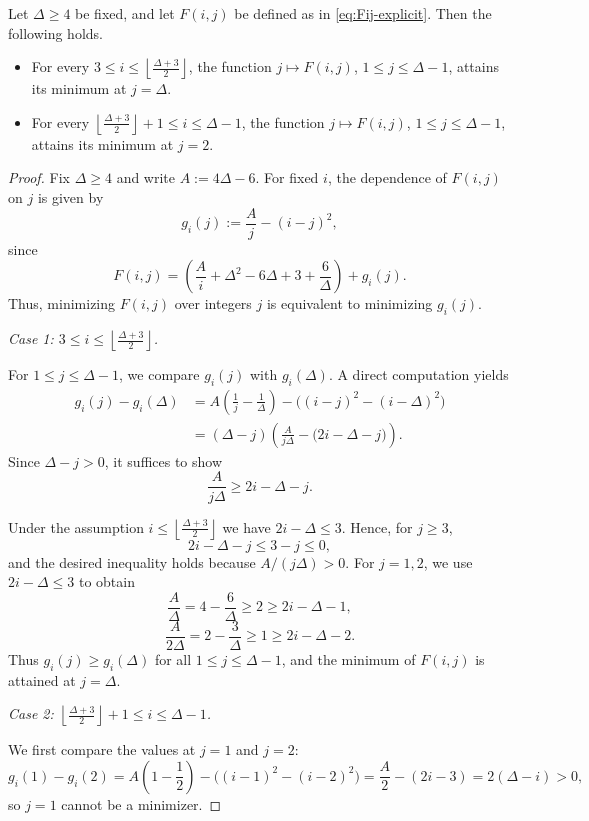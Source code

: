 \documentclass[preprint,12pt]{elsarticle}
\begin{document}
\begin{lemma}
\label{lem:optimal-pair-F}
Let $\Delta \ge 4$ be fixed, and let $F(i,j)$ be defined as in
\eqref{eq:Fij-explicit}.
Then the following holds.
\begin{itemize}
\item For every $3 \le i \le \left\lfloor \frac{\Delta+3}{2} \right\rfloor$, the function
$j \mapsto F(i,j)$, $1 \le j \le \Delta-1$, attains its minimum at $j=\Delta$.
\item For every $\left\lfloor \frac{\Delta+3}{2} \right\rfloor+1 \le i \le \Delta-1$, the function
$j \mapsto F(i,j)$, $1 \le j \le \Delta-1$, attains its minimum at $j=2$.
\end{itemize}
\end{lemma}

\begin{proof}
Fix $\Delta\ge 4$ and write $A:=4\Delta-6$. For fixed $i$, the dependence of $F(i,j)$
on $j$ is given by
\[
g_i(j):=\frac{A}{j}-(i-j)^2,
\]
since
\[
F(i,j)=\left(\frac{A}{i}+\Delta^2-6\Delta+3+\frac{6}{\Delta}\right)+g_i(j).
\]
Thus, minimizing $F(i,j)$ over integers $j$ is equivalent to minimizing $g_i(j)$.

\medskip
\noindent\emph{Case 1: $3\le i \le \left\lfloor\frac{\Delta+3}{2}\right\rfloor$.}

For $1\le j\le \Delta-1$, we compare $g_i(j)$ with $g_i(\Delta)$.
A direct computation yields
\begin{align*}
g_i(j)-g_i(\Delta)
&=A\left(\frac{1}{j}-\frac{1}{\Delta}\right)
   -\bigl((i-j)^2-(i-\Delta)^2\bigr)\\
&=(\Delta-j)\left(\frac{A}{j\Delta}-\bigl(2i-\Delta-j\bigr)\right).
\end{align*}
Since $\Delta-j>0$, it suffices to show
\[
\frac{A}{j\Delta}\ge 2i-\Delta-j.
\]

Under the assumption $i\le \left\lfloor\frac{\Delta+3}{2}\right\rfloor$ we have
$2i-\Delta\le 3$. Hence, for $j\ge 3$,
\[
2i-\Delta-j\le 3-j\le 0,
\]
and the desired inequality holds because $A/(j\Delta)>0$.
For $j=1,2$, we use $2i-\Delta\le 3$ to obtain
\[
\frac{A}{\Delta}=4-\frac{6}{\Delta}\ge 2\ge 2i-\Delta-1,
\]
\[
\frac{A}{2\Delta}=2-\frac{3}{\Delta}\ge 1\ge 2i-\Delta-2.
\]
Thus $g_i(j)\ge g_i(\Delta)$ for all $1\le j\le \Delta-1$, and the minimum of
$F(i,j)$ is attained at $j=\Delta$.

\medskip
\noindent\emph{Case 2: $\left\lfloor\frac{\Delta+3}{2}\right\rfloor+1 \le i \le \Delta-1$.}

We first compare the values at $j=1$ and $j=2$:
\[
g_i(1)-g_i(2)
=A\left(1-\frac12\right)-\bigl((i-1)^2-(i-2)^2\bigr)
=\frac{A}{2}-(2i-3)=2(\Delta-i)>0,
\]
so $j=1$ cannot be a minimizer.


\end{proof}
\end{document}
